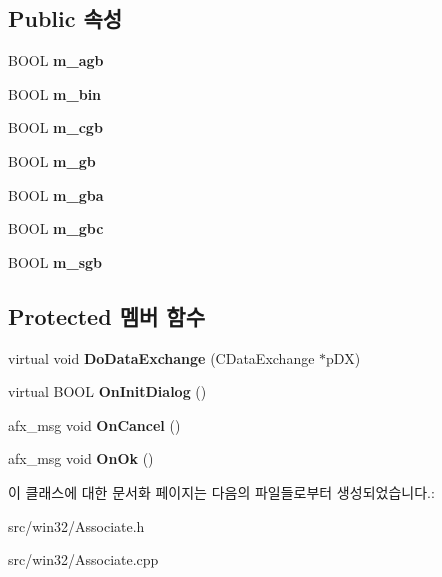 \subsection*{Public 속성}
\begin{DoxyCompactItemize}
\item 
\mbox{\label{class_associate_ab6d59a4b47c5529c1e5f5b8f8b5a6f82}} 
B\+O\+OL {\bfseries m\+\_\+agb}
\item 
\mbox{\label{class_associate_ac132c6bfb6f547702c2e7386650a0a4c}} 
B\+O\+OL {\bfseries m\+\_\+bin}
\item 
\mbox{\label{class_associate_af245524b613121a7a5291deebfb97e0e}} 
B\+O\+OL {\bfseries m\+\_\+cgb}
\item 
\mbox{\label{class_associate_af4479f05150eb128332d06cba68a955b}} 
B\+O\+OL {\bfseries m\+\_\+gb}
\item 
\mbox{\label{class_associate_a7c20c41d1b724e80532ff888b6c7ea56}} 
B\+O\+OL {\bfseries m\+\_\+gba}
\item 
\mbox{\label{class_associate_a399cc9528f3efc32ec5971fc5e614e97}} 
B\+O\+OL {\bfseries m\+\_\+gbc}
\item 
\mbox{\label{class_associate_a0221f6743a817911817d464579b4a038}} 
B\+O\+OL {\bfseries m\+\_\+sgb}
\end{DoxyCompactItemize}
\subsection*{Protected 멤버 함수}
\begin{DoxyCompactItemize}
\item 
\mbox{\label{class_associate_af10575d274826cc658ebb2e6a823aa35}} 
virtual void {\bfseries Do\+Data\+Exchange} (C\+Data\+Exchange $\ast$p\+DX)
\item 
\mbox{\label{class_associate_a66532001ec5d28abd61684b0f62b032b}} 
virtual B\+O\+OL {\bfseries On\+Init\+Dialog} ()
\item 
\mbox{\label{class_associate_a76fb7e63100511a6d22c53cf3306b8f4}} 
afx\+\_\+msg void {\bfseries On\+Cancel} ()
\item 
\mbox{\label{class_associate_abb81ded9b91053ed12804ee8674ae860}} 
afx\+\_\+msg void {\bfseries On\+Ok} ()
\end{DoxyCompactItemize}


이 클래스에 대한 문서화 페이지는 다음의 파일들로부터 생성되었습니다.\+:\begin{DoxyCompactItemize}
\item 
src/win32/Associate.\+h\item 
src/win32/Associate.\+cpp\end{DoxyCompactItemize}
